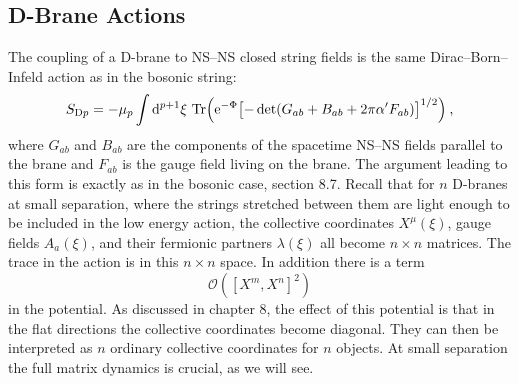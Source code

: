 \subsection*{D-Brane Actions}

The coupling of a D-brane to NS--NS closed string fields is the same Dirac--Born--Infeld action as in the bosonic string:
\begin{equation}
	S_{\mathrm{D}p} = -\mu_p\int \mathrm{d}^{p+1}\xi\,\operatorname{Tr}\Bigl(\mathrm{e}^{-\Phi}\bigl[-\det(G_{ab} + B_{ab} + 2\pi\alpha' F_{ab})\bigr]^{1/2}\Bigr) \:, \label{13.3.14}
\end{equation}
where $G_{ab}$ and $B_{ab}$ are the components of the spacetime NS--NS fields parallel to the brane and $F_{ab}$ is the gauge field living on the brane. The argument leading to this form is exactly as in the bosonic case, section 8.7. Recall that for $n$ D-branes at small separation, where the strings stretched between them are light enough to be included in the low energy action, the collective coordinates $X^\mu(\xi)$, gauge fields $A_a(\xi)$, and their fermionic partners $\lambda(\xi)$ all become $n \times n$ matrices. The trace in the action is in this $n \times n$ space. In addition there is a term
\begin{equation}
	\mathcal{O}([X^m, X^n]^2) \label{13.3.15}
\end{equation}
in the potential. As discussed in chapter 8, the effect of this potential is that in the flat directions the collective coordinates become diagonal. They can then be interpreted as $n$ ordinary collective coordinates for $n$ objects. At small separation the full matrix dynamics is crucial, as we will see.

